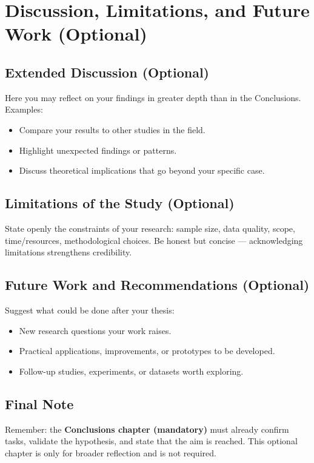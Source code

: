 \chapter{Discussion, Limitations, and Future Work (Optional)}
\label{chap:optional-discussion}

%
%
%      

\section{Extended Discussion (Optional)}
Here you may reflect on your findings in greater depth than in the Conclusions.  
Examples:
\begin{itemize}
  \item Compare your results to other studies in the field.
  \item Highlight unexpected findings or patterns.
  \item Discuss theoretical implications that go beyond your specific case.
\end{itemize}

\section{Limitations of the Study (Optional)}
State openly the constraints of your research:
sample size, data quality, scope, time/resources, methodological choices.  
Be honest but concise — acknowledging limitations strengthens credibility.

\section{Future Work and Recommendations (Optional)}
Suggest what could be done after your thesis:
\begin{itemize}
  \item New research questions your work raises.
  \item Practical applications, improvements, or prototypes to be developed.
  \item Follow-up studies, experiments, or datasets worth exploring.
\end{itemize}

\section*{Final Note}
Remember: the \textbf{Conclusions chapter (mandatory)} must already
confirm tasks, validate the hypothesis, and state that the aim is reached.  
This optional chapter is only for broader reflection and is not required.
